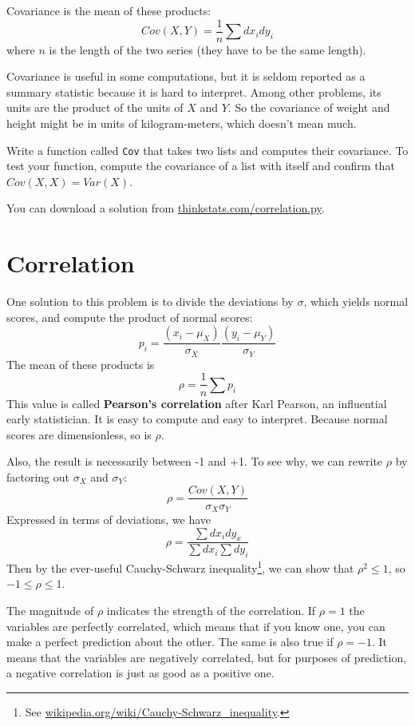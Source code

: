 \documentclass[12pt]{book}
\begin{document}
Covariance is the mean of these products:
%
\[ Cov(X,Y) = \frac{1}{n} \sum dx_i dy_i \]
%
where $n$ is the length of the two series (they have to be the same
length).

Covariance is useful in some computations, but
it is seldom reported as a summary statistic because it is hard to
interpret.  Among other problems, its units are the product of the
units of $X$ and $Y$.  So the covariance of weight and height might be
in units of kilogram-meters, which doesn't mean much.

\begin{ex}

Write a function called {\tt Cov} that takes two lists
and computes their covariance.  To test your function, compute
the covariance of a list with itself and confirm that
$Cov(X, X) = Var(X)$.

You can download a solution from
\url{thinkstats.com/correlation.py}.

\end{ex}


\section{Correlation}

One solution to this problem is to divide the deviations by $\sigma$,
which yields normal scores, and compute the product of normal scores:
%
\[ p_i = \frac{(x_i - \mu_X)}{\sigma_X} \frac{(y_i - \mu_Y)}{\sigma_Y} \]
%
The mean of these products is
%
\[ \rho = \frac{1}{n} \sum p_i \]
%
This value is called {\bf Pearson's correlation} after Karl Pearson,
an influential early statistician.  It is easy to compute and easy to
interpret.  Because normal scores are dimensionless, so is $\rho$.

Also, the result is necessarily between -1 and +1.  To see why, we
can rewrite $\rho$ by factoring out $\sigma_X$ and $\sigma_Y$:
%
\[ \rho = \frac{Cov(X,Y)}{\sigma_X \sigma_Y} \]
%
Expressed in terms of deviations, we have
%
\[ \rho = \frac{\sum dx_i dy_x}{\sum dx_i \sum dy_i} \]
%
Then by the ever-useful Cauchy-Schwarz inequality\footnote{See
  \url{wikipedia.org/wiki/Cauchy-Schwarz_inequality}.}, we can show
that $\rho^2 \le 1$, so $-1 \le \rho \le 1$.

The magnitude of $\rho$ indicates the strength of the correlation.  If
$\rho=1$ the variables are perfectly correlated, which means that if
you know one, you can make a perfect prediction about the other.  The
same is also true if $\rho=-1$.  It means that the variables
are negatively correlated, but for purposes of prediction, a
negative correlation is just as good as a positive one.
\end{document}
